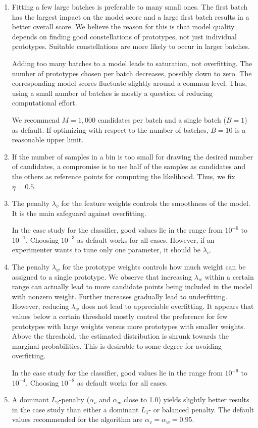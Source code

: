 \begin{enumerate}
\item Fitting a few large batches is preferable to many small ones.
The first batch has the largest impact on the model score and a large first batch results in a better overall score.
We believe the reason for this is that model quality depends on finding good constellations of prototypes, not just individual prototypes.
Suitable constellations are more likely to occur in larger batches.\par
%
Adding too many batches to a model leads to saturation, not overfitting.
The number of prototypes chosen per batch decreases, possibly down to zero.
The corresponding model scores fluctuate slightly around a common level.
Thus, using a small number of batches is mostly a question of reducing computational effort.\par
%
We recommend $M=1,000$ candidates per batch and a single batch ($B=1$) as default.
If optimizing with respect to the number of batches, $B=10$ is a reasonable upper limit.
%
\item If the number of samples in a bin is too small for drawing the desired number of candidates, a compromise is to use half of the samples as candidates and the others as reference points for computing the likelihood.
Thus, we fix $\eta=0.5$.
%
\item The penalty $\lambda_v$ for the feature weights controls the smoothness of the model.
It is the main safeguard against overfitting.\par
%
In the case study for the classifier, good values lie in the range from $10^{-6}$ to $10^{-1}$.
Choosing $10^{-3}$ as default works for all cases.
However, if an experimenter wants to tune only one parameter, it should be $\lambda_v$.
%
\item The penalty $\lambda_w$ for the prototype weights controls how much weight can be assigned to a single prototype.
We observe that increasing $\lambda_w$ within a certain range can actually lead to more candidate points being included in the model with nonzero weight.
Further increases gradually lead to underfitting.
However, reducing $\lambda_w$ does not lead to appreciable overfitting.
It appears that values below a certain threshold mostly control the preference for few prototypes with large weights versus more prototypes with smaller weights.
Above the threshold, the estimated distribution is shrunk towards the marginal probabilities.
This is desirable to some degree for avoiding overfitting.\par
%
In the case study for the classifier, good values lie in the range from $10^{-9}$ to $10^{-4}$.
Choosing $10^{-8}$ as default works for all cases.
%
\item A dominant $L_2$-penalty ($\alpha_v$ and $\alpha_w$ close to 1.0) yields slightly better results in the case study than either a dominant $L_1$- or balanced penalty.
The default values recommended for the algorithm are $\alpha_v=\alpha_w=0.95$.
\end{enumerate}
